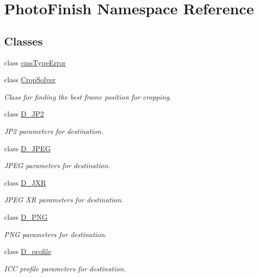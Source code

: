 \hypertarget{namespace_photo_finish}{}\section{Photo\+Finish Namespace Reference}
\label{namespace_photo_finish}
\subsection*{Classes}
\begin{DoxyCompactItemize}
\item 
class \hyperlink{class_photo_finish_1_1cms_type_error}{cms\+Type\+Error}
\item 
class \hyperlink{class_photo_finish_1_1_crop_solver}{Crop\+Solver}
\begin{DoxyCompactList}\small\item\em Class for finding the best frame position for cropping. \end{DoxyCompactList}\item 
class \hyperlink{class_photo_finish_1_1_d___j_p2}{D\+\_\+\+J\+P2}
\begin{DoxyCompactList}\small\item\em J\+P2 parameters for destination. \end{DoxyCompactList}\item 
class \hyperlink{class_photo_finish_1_1_d___j_p_e_g}{D\+\_\+\+J\+P\+EG}
\begin{DoxyCompactList}\small\item\em J\+P\+EG parameters for destination. \end{DoxyCompactList}\item 
class \hyperlink{class_photo_finish_1_1_d___j_x_r}{D\+\_\+\+J\+XR}
\begin{DoxyCompactList}\small\item\em J\+P\+EG XR parameters for destination. \end{DoxyCompactList}\item 
class \hyperlink{class_photo_finish_1_1_d___p_n_g}{D\+\_\+\+P\+NG}
\begin{DoxyCompactList}\small\item\em P\+NG parameters for destination. \end{DoxyCompactList}\item 
class \hyperlink{class_photo_finish_1_1_d__profile}{D\+\_\+profile}
\begin{DoxyCompactList}\small\item\em I\+CC profile parameters for destination. \end{DoxyCompactList}\item 

\end{DoxyCompactItemize}

